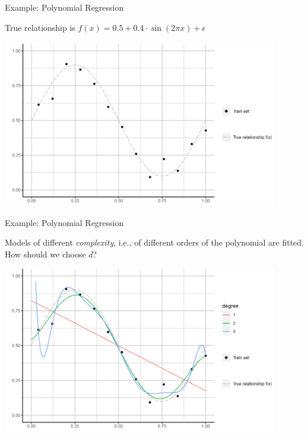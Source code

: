 \begin{frame}{Example: Polynomial Regression}

True relationship is
\(f(x) = 0.5 + 0.4 \cdot \sin (2 \pi x) + \epsilon\)

\scriptsize
\begin{center}
\includegraphics[width=0.9\textwidth]{plots/poly-reg01.png}
\end{center}

\normalsize 

\end{frame}

\begin{frame}{Example: Polynomial Regression}

Models of different \emph{complexity}, i.e., of different orders of the
polynomial are fitted. How should we choose \(d\)?

\scriptsize

\begin{center}
\includegraphics[width=0.9\textwidth]{plots/poly-reg02.png}
\end{center}

\normalsize 

\end{frame}

